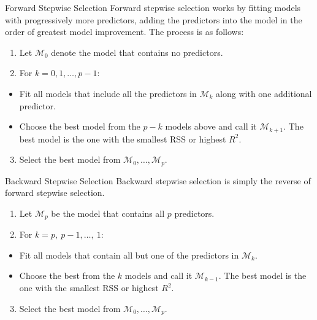 \documentclass[
  ignorenonframetext,
  aspectratio=169,
]{beamer}
\providecommand{\tightlist}{%
  \setlength{\itemsep}{0pt}\setlength{\parskip}{0pt}}\usepackage{longtable,booktabs,array}
\begin{document}
\begin{frame}{Forward Stepwise Selection}
\protect\hypertarget{forward-stepwise-selection}{}
Forward stepwise selection works by fitting models with progressively
more predictors, adding the predictors into the model in the order of
greatest model improvement. The process is as follows:

\begin{enumerate}
\item
  Let \(\mathcal{M}_0\) denote the model that contains no predictors.
\item
  For \(k = 0, 1, \dots, p-1\):
\end{enumerate}

\begin{itemize}
\item
  Fit all models that include all the predictors in \(\mathcal{M}_k\)
  along with one additional predictor.
\item
  Choose the best model from the \(p-k\) models above and call it
  \(\mathcal{M}_{k+1}\). The best model is the one with the smallest RSS
  or highest \(R^2\).
\end{itemize}

\begin{enumerate}
\setcounter{enumi}{2}
\tightlist
\item
  Select the best model from
  \(\mathcal{M}_{0}, \ldots, \mathcal{M}_{p}\).
\end{enumerate}
\end{frame}

\begin{frame}{Backward Stepwise Selection}
\protect\hypertarget{backward-stepwise-selection}{}
Backward stepwise selection is simply the reverse of forward stepwise
selection.

\begin{enumerate}
\item
  Let \(\mathcal{M}_p\) be the model that contains all \(p\) predictors.
\item
  For \(k = p,\ p-1, \dots,\ 1:\)
\end{enumerate}

\begin{itemize}
\item
  Fit all models that contain all but one of the predictors in
  \(\mathcal{M}_k\).
\item
  Choose the best from the \(k\) models and call it
  \(\mathcal{M}_{k-1}\). The best model is the one with the smallest RSS
  or highest \(R^2\).
\end{itemize}

\begin{enumerate}
\setcounter{enumi}{2}
\tightlist
\item
  Select the best model from
  \(\mathcal{M}_{0}, \ldots, \mathcal{M}_{p}\).
\end{enumerate}
\end{frame}
\end{document}
